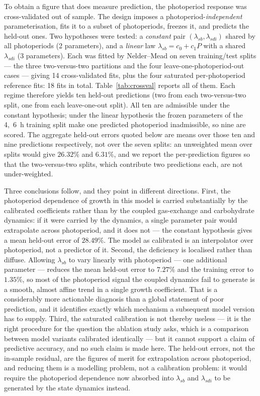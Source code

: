 \documentclass[a4paper,fleqn]{cas-sc}
\begin{document}
To obtain a figure that does measure prediction, the photoperiod response was
cross-validated out of sample. The design imposes a
photoperiod-\emph{independent} parameterisation, fits it to a subset of
photoperiods, freezes it, and predicts the held-out ones. Two hypotheses were
tested: a \emph{constant} pair $(\lambda_{sb}, \lambda_{sdi})$ shared by all
photoperiods (2 parameters), and a \emph{linear} law
$\lambda_{sb} = c_0 + c_1 P$ with a shared $\lambda_{sdi}$ (3 parameters).
Each was fitted by Nelder--Mead on seven training/test splits --- the three
two-versus-two partitions and the four leave-one-photoperiod-out cases ---
giving 14 cross-validated fits, plus the four saturated per-photoperiod
reference fits: 18 fits in total. Table~\ref{tab:crossval} reports all of
them. Each regime therefore yields ten held-out predictions (two from each
two-versus-two split, one from each leave-one-out split). All ten are
admissible under the constant hypothesis; under the linear hypothesis the
frozen parameters of the \mbox{4, 6~h} training split make one predicted
photoperiod inadmissible, so nine are scored. The aggregate held-out errors
quoted below are means over those ten and nine predictions respectively, not
over the seven splits: an unweighted mean over splits would give $26.32\%$ and
$6.31\%$, and we report the per-prediction figures so that the two-versus-two
splits, which contribute two predictions each, are not under-weighted.

Three conclusions follow, and they point in different directions. First, the
photoperiod dependence of growth in this model is carried substantially by the
calibrated coefficients rather than by the coupled gas-exchange and
carbohydrate dynamics: if it were carried by the dynamics, a single parameter
pair would extrapolate across photoperiod, and it does not --- the constant
hypothesis gives a mean held-out error of $28.49\%$. The model as calibrated
is an interpolator over photoperiod, not a predictor of it. Second, the
deficiency is localised rather than diffuse. Allowing $\lambda_{sb}$ to vary
linearly with photoperiod --- one additional parameter --- reduces the mean
held-out error to $7.27\%$ and the training error to $1.35\%$, so most of the
photoperiod signal the coupled dynamics fail to generate is a smooth,
almost affine trend in a single growth coefficient. That is a considerably
more actionable diagnosis than a global statement of poor prediction, and it
identifies exactly which mechanism a subsequent model version has to supply.
Third, the saturated calibration is not thereby useless --- it is the right
procedure for the question the ablation study asks, which is a comparison
between model variants calibrated identically --- but it cannot support a
claim of predictive accuracy, and no such claim is made here. The held-out
errors, not the in-sample residual, are the figures of merit for
extrapolation across photoperiod, and reducing them is a modelling problem,
not a calibration problem: it would require the photoperiod dependence now
absorbed into $\lambda_{sb}$ and $\lambda_{sdi}$ to be generated by the state
dynamics instead.
\end{document}
